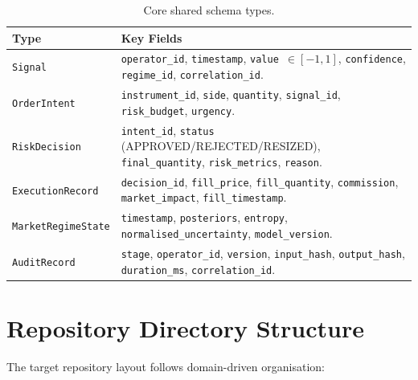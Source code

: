 \documentclass[12pt,openany]{book}
\numberwithin{equation}{chapter}
\theoremstyle{plain}
\theoremstyle{definition}
\theoremstyle{remark}
\begin{document}
\begin{table}[H]
\centering
\caption{Core shared schema types.}
\label{tab:schemas}
\small
\begin{tabularx}{\textwidth}{p{4.5cm} p{10.0cm}}
\toprule
\textbf{Type} & \textbf{Key Fields} \\
\midrule
\texttt{Signal} &
    \texttt{operator\_id}, \texttt{timestamp}, \texttt{value $\in [-1,1]$},
    \texttt{confidence}, \texttt{regime\_id}, \texttt{correlation\_id}. \\
\midrule
\texttt{OrderIntent} &
    \texttt{instrument\_id}, \texttt{side}, \texttt{quantity},
    \texttt{signal\_id}, \texttt{risk\_budget}, \texttt{urgency}. \\
\midrule
\texttt{RiskDecision} &
    \texttt{intent\_id}, \texttt{status} (APPROVED/REJECTED/RESIZED),
    \texttt{final\_quantity}, \texttt{risk\_metrics}, \texttt{reason}. \\
\midrule
\texttt{ExecutionRecord} &
    \texttt{decision\_id}, \texttt{fill\_price}, \texttt{fill\_quantity},
    \texttt{commission}, \texttt{market\_impact}, \texttt{fill\_timestamp}. \\
\midrule
\texttt{MarketRegimeState} &
    \texttt{timestamp}, \texttt{posteriors}, \texttt{entropy},
    \texttt{normalised\_uncertainty}, \texttt{model\_version}. \\
\midrule
\texttt{AuditRecord} &
    \texttt{stage}, \texttt{operator\_id}, \texttt{version},
    \texttt{input\_hash}, \texttt{output\_hash}, \texttt{duration\_ms},
    \texttt{correlation\_id}. \\
\bottomrule
\end{tabularx}
\end{table}

\section{Repository Directory Structure}

The target repository layout follows domain-driven organisation:
\end{document}
